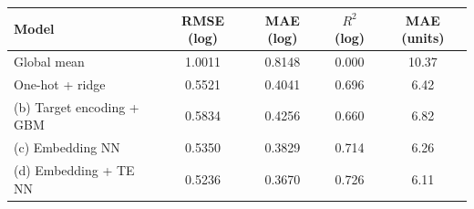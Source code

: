 \begin{tabular}{lcccc}
\toprule
Model & RMSE (log) & MAE (log) & $R^2$ (log) & MAE (units) \\
\midrule
Global mean & 1.0011 & 0.8148 & 0.000 & 10.37 \\
One-hot + ridge & 0.5521 & 0.4041 & 0.696 & 6.42 \\
(b) Target encoding + GBM & 0.5834 & 0.4256 & 0.660 & 6.82 \\
(c) Embedding NN & 0.5350 & 0.3829 & 0.714 & 6.26 \\
(d) Embedding + TE NN & 0.5236 & 0.3670 & 0.726 & 6.11 \\
\bottomrule
\end{tabular}

